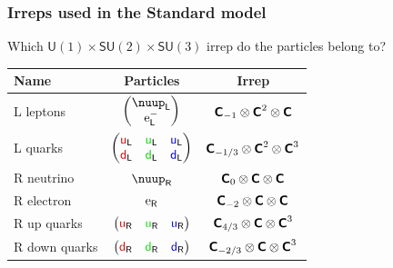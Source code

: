 \documentclass[english, fleqn]{beamer}
\renewcommand\eup{\text e}
\begin{document}
\begin{frame}
    \frametitle{Irreps used in the Standard model}

    Which $\mathsf U(1) \times \mathsf{SU}(2) \times \mathsf{SU}(3)$ irrep do the particles belong to?

    \begin{tabular}{lcc}
        \toprule
        Name & Particles & Irrep \\
        \midrule
        L leptons &
        $\begin{pmatrix}
            \nuup_\mathsf L \\
            \eup^-_\mathsf L
        \end{pmatrix}$ &
        $\text{\bfseries\sffamily{C}}_{-1} \otimes \text{\bfseries\sffamily{C}}^2 \otimes \text{\bfseries\sffamily{C}}$ \\
        L quarks &
        $\begin{pmatrix}
            \textcolor{qred}{\mathsf u}_\mathsf L &
            \textcolor{qgreen}{\mathsf u}_\mathsf L &
            \textcolor{qblue}{\mathsf u}_\mathsf L \\
            \textcolor{qred}{\mathsf d}_\mathsf L &
            \textcolor{qgreen}{\mathsf d}_\mathsf L &
            \textcolor{qblue}{\mathsf d}_\mathsf L
        \end{pmatrix}$ &
        $\text{\bfseries\sffamily{C}}_{-1/3} \otimes \text{\bfseries\sffamily{C}}^2 \otimes \text{\bfseries\sffamily{C}}^3$ \\
        R neutrino &
        $\nuup_\mathsf R$ &
        $\text{\bfseries\sffamily{C}}_{0} \otimes \text{\bfseries\sffamily{C}} \otimes \text{\bfseries\sffamily{C}}$ \\
        R electron &
        $\eup_\mathsf R$ &
        $\text{\bfseries\sffamily{C}}_{-2} \otimes \text{\bfseries\sffamily{C}} \otimes \text{\bfseries\sffamily{C}}$ \\
        R up quarks &
        $\begin{pmatrix}
            \textcolor{qred}{\mathsf u}_\mathsf R &
            \textcolor{qgreen}{\mathsf u}_\mathsf R &
            \textcolor{qblue}{\mathsf u}_\mathsf R
        \end{pmatrix}$ &
        $\text{\bfseries\sffamily{C}}_{4/3} \otimes \text{\bfseries\sffamily{C}} \otimes \text{\bfseries\sffamily{C}}^3$ \\
        R down quarks &
        $\begin{pmatrix}
            \textcolor{qred}{\mathsf d}_\mathsf R &
            \textcolor{qgreen}{\mathsf d}_\mathsf R &
            \textcolor{qblue}{\mathsf d}_\mathsf R
        \end{pmatrix}$ &
        $\text{\bfseries\sffamily{C}}_{-2/3} \otimes \text{\bfseries\sffamily{C}} \otimes \text{\bfseries\sffamily{C}}^3$ \\
        \bottomrule
    \end{tabular}
\end{frame}
\end{document}
